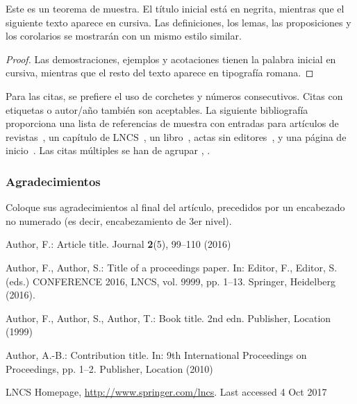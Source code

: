 \documentclass{sistedes}
\begin{document}
\begin{theorem}
Este es un teorema de muestra. El título inicial está en negrita, mientras
que el siguiente texto aparece en cursiva. Las definiciones, los lemas,
las proposiciones y los corolarios se mostrarán con un  mismo estilo similar.
\end{theorem}
%
%
\begin{proof}
Las demostraciones, ejemplos y acotaciones tienen la palabra inicial en cursiva,
mientras que el resto del texto aparece en tipografía romana.
\end{proof}
Para las citas, se prefiere el uso de corchetes
y números consecutivos. Citas con etiquetas o autor/año también
son aceptables. La siguiente bibliografía proporciona una lista de referencias
de muestra con entradas para artículos de revistas~\cite{ref_article1},
un capítulo de LNCS~\cite{ref_lncs1}, un libro~\cite{ref_book1},
actas sin editores~\cite{ref_proc1}, y una página de inicio~\cite{ref_url1}.
Las citas múltiples se han de agrupar
\cite{ref_article1,ref_lncs1,ref_book1},
\cite{ref_article1,ref_book1,ref_proc1,ref_url1}.

\subsubsection{Agradecimientos} Coloque sus agradecimientos al final del
artículo, precedidos por un encabezado no numerado (es decir, encabezamiento
de 3er nivel).

%
%
%
% 
% 
%
\begin{thebibliography}{8}
Author, F.: Article title. Journal \textbf{2}(5), 99--110 (2016)

Author, F., Author, S.: Title of a proceedings paper. In: Editor,
F., Editor, S. (eds.) CONFERENCE 2016, LNCS, vol. 9999, pp. 1--13.
Springer, Heidelberg (2016). 

Author, F., Author, S., Author, T.: Book title. 2nd edn. Publisher,
Location (1999)

Author, A.-B.: Contribution title. In: 9th International Proceedings
on Proceedings, pp. 1--2. Publisher, Location (2010)

LNCS Homepage, \url{http://www.springer.com/lncs}. Last accessed 4
Oct 2017
\end{thebibliography}
\end{document}
